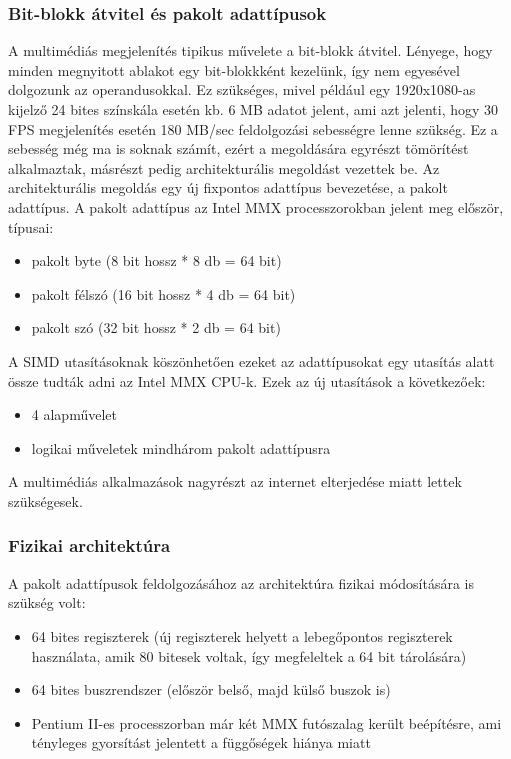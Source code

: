\subsubsection{Bit-blokk átvitel és pakolt adattípusok}
A multimédiás megjelenítés tipikus művelete a bit-blokk átvitel.
Lényege, hogy minden megnyitott ablakot egy bit-blokkként kezelünk, így nem egyesével dolgozunk az operandusokkal.
Ez szükséges, mivel például egy 1920x1080-as kijelző 24 bites színskála esetén kb. 6 MB adatot jelent, ami azt jelenti, hogy 30 FPS megjelenítés esetén 180 MB/sec feldolgozási sebességre lenne szükség.
Ez a sebesség még ma is soknak számít, ezért a megoldására egyrészt tömörítést alkalmaztak, másrészt pedig architekturális megoldást vezettek be.
Az architekturális megoldás egy új fixpontos adattípus bevezetése, a pakolt adattípus.
A pakolt adattípus az Intel MMX processzorokban jelent meg először, típusai:
\begin{itemize}
    \item pakolt byte (8 bit hossz * 8 db = 64 bit)
    \item pakolt félszó (16 bit hossz * 4 db = 64 bit)
    \item pakolt szó (32 bit hossz * 2 db = 64 bit)
\end{itemize}
A SIMD utasításoknak köszönhetően ezeket az adattípusokat egy utasítás alatt össze tudták adni az Intel MMX CPU-k.
Ezek az új utasítások a következőek:
\begin{itemize}
    \item 4 alapművelet
    \item logikai műveletek mindhárom pakolt adattípusra
\end{itemize}
A multimédiás alkalmazások nagyrészt az internet elterjedése miatt lettek szükségesek.
\subsubsection{Fizikai architektúra}
A pakolt adattípusok feldolgozásához az architektúra fizikai módosítására is szükség volt:
\begin{itemize}
    \item 64 bites regiszterek (új regiszterek helyett a lebegőpontos regiszterek használata, amik 80 bitesek voltak, így megfeleltek a 64 bit tárolására)
    \item 64 bites buszrendszer (először belső, majd külső buszok is)
    \item Pentium II-es processzorban már két MMX futószalag került beépítésre, ami tényleges gyorsítást jelentett a függőségek hiánya miatt
\end{itemize}

